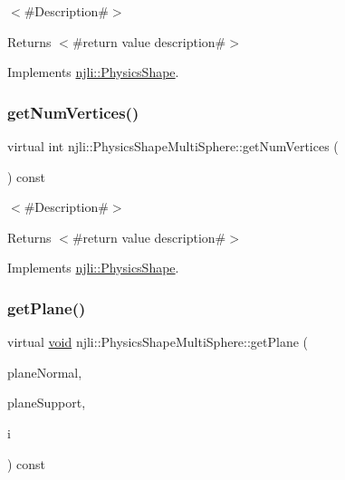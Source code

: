 $<$\#\+Description\#$>$

\begin{DoxyReturn}{Returns}
$<$\#return value description\#$>$ 
\end{DoxyReturn}


Implements \mbox{\hyperlink{classnjli_1_1_physics_shape_a11cb80220393bfce177b8bdc34f7f359}{njli\+::\+Physics\+Shape}}.

\mbox{\label{classnjli_1_1_physics_shape_multi_sphere_a8ffb7cb487afc5582cb4c1ae4997a065}} 
\subsubsection{\texorpdfstring{get\+Num\+Vertices()}{getNumVertices()}}
{\footnotesize\ttfamily virtual int njli\+::\+Physics\+Shape\+Multi\+Sphere\+::get\+Num\+Vertices (\begin{DoxyParamCaption}{ }\end{DoxyParamCaption}) const\hspace{0.3cm}{\ttfamily [virtual]}}

$<$\#\+Description\#$>$

\begin{DoxyReturn}{Returns}
$<$\#return value description\#$>$ 
\end{DoxyReturn}


Implements \mbox{\hyperlink{classnjli_1_1_physics_shape_ac3f7cc28341fd58ace164bf8666480f0}{njli\+::\+Physics\+Shape}}.

\mbox{\label{classnjli_1_1_physics_shape_multi_sphere_ae0b4b79c9708c963406aabf07e699d5b}} 
\subsubsection{\texorpdfstring{get\+Plane()}{getPlane()}}
{\footnotesize\ttfamily virtual \mbox{\hyperlink{_thread_8h_af1e856da2e658414cb2456cb6f7ebc66}{void}} njli\+::\+Physics\+Shape\+Multi\+Sphere\+::get\+Plane (\begin{DoxyParamCaption}\item[{bt\+Vector3 \&}]{plane\+Normal,  }\item[{bt\+Vector3 \&}]{plane\+Support,  }\item[{int}]{i }\end{DoxyParamCaption}) const\hspace{0.3cm}{\ttfamily [virtual]}}

